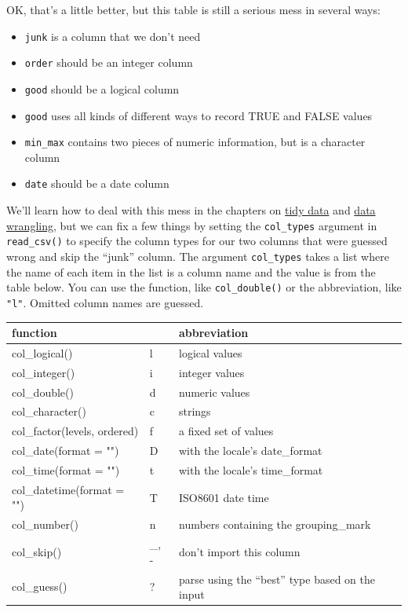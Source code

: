 \documentclass[
  oneside]{book}
\providecommand{\tightlist}{%
  \setlength{\itemsep}{0pt}\setlength{\parskip}{0pt}}
\begin{document}
OK, that's a little better, but this table is still a serious mess in several ways:

\begin{itemize}
\tightlist
\item
  \texttt{junk} is a column that we don't need
\item
  \texttt{order} should be an integer column
\item
  \texttt{good} should be a logical column
\item
  \texttt{good} uses all kinds of different ways to record TRUE and FALSE values
\item
  \texttt{min\_max} contains two pieces of numeric information, but is a character column
\item
  \texttt{date} should be a date column
\end{itemize}

We'll learn how to deal with this mess in the chapters on \protect\hyperlink{tidyr}{tidy data} and \protect\hyperlink{dplyr}{data wrangling}, but we can fix a few things by setting the \texttt{col\_types} argument in \texttt{read\_csv()} to specify the column types for our two columns that were guessed wrong and skip the ``junk'' column. The argument \texttt{col\_types} takes a list where the name of each item in the list is a column name and the value is from the table below. You can use the function, like \texttt{col\_double()} or the abbreviation, like \texttt{"l"}. Omitted column names are guessed.

\begin{longtable}[]{@{}lll@{}}
\toprule
function & & abbreviation \\
\midrule
\endhead
col\_logical() & l & logical values \\
col\_integer() & i & integer values \\
col\_double() & d & numeric values \\
col\_character() & c & strings \\
col\_factor(levels, ordered) & f & a fixed set of values \\
col\_date(format = "") & D & with the locale's date\_format \\
col\_time(format = "") & t & with the locale's time\_format \\
col\_datetime(format = "") & T & ISO8601 date time \\
col\_number() & n & numbers containing the grouping\_mark \\
col\_skip() & \_, - & don't import this column \\
col\_guess() & ? & parse using the ``best'' type based on the input \\
\bottomrule
\end{longtable}
\end{document}
